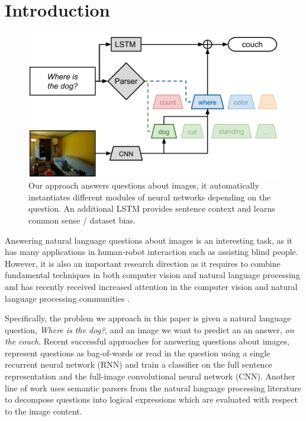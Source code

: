 \section{Introduction}
\begin{figure}[t]
\begin{center}
\includegraphics[width=\linewidth]{fig/teaser}
\end{center}
   \caption{Our approach answers questions about images, it automatically instantiates different modules of neural networks depending on the question. An additional LSTM provides sentence context and learns common sense / dataset bias.}
\label{fig:teaser}
\end{figure}
Answering natural language questions about images is an interesting task, as it has many applications in human-robot interaction such as assisting blind people. However, it is also an important research direction as it requires to combine fundamental techniques in both computer vision and natural language processing and has recently received increased attention in the computer vision and natural language processing communities \cite{antol15iccv,gao2015you,ma15arxiv,malinowski15iccv,ren2015image,yu15arxiv}.

Specifically, the problem we approach in this paper is given a natural language question, \eg \emph{Where is the dog?}, and an image we want to predict an an answer, \eg \emph{on the couch}. 
Recent successful approaches for answering questions about images, represent questions as bag-of-words \cite{} or read in the question using a single recurrent neural network (RNN) \cite{malinowski15iccv}\cite{} and train a classifier on the full sentence representation and the full-image convolutional neural network (CNN). 
Another line of work  \cite{malinowski15nips} uses semantic parsers from the natural language processing
literature to decompose questions into logical expressions which are evaluated with respect to the image content.


